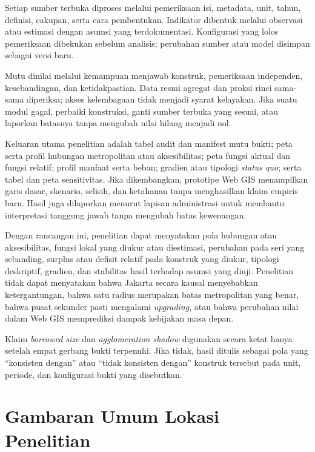 \documentclass[11pt,a4paper,oneside,openany,indonesian]{report}
\begin{document}
Setiap sumber terbuka diproses melalui pemeriksaan isi, metadata, unit,
tahun, definisi, cakupan, serta cara pembentukan. Indikator dibentuk
melalui observasi atau estimasi dengan asumsi yang terdokumentasi.
Konfigurasi yang lolos pemeriksaan dibekukan sebelum analisis; perubahan
sumber atau model disimpan sebagai versi baru.

Mutu dinilai melalui kemampuan menjawab konstruk, pemeriksaan
independen, kesebandingan, dan ketidakpastian. Data resmi agregat dan
proksi rinci sama-sama diperiksa; akses kelembagaan tidak menjadi syarat
kelayakan. Jika suatu modul gagal, perbaiki konstruksi, ganti sumber
terbuka yang sesuai, atau laporkan batasnya tanpa mengubah nilai hilang
menjadi nol.

Keluaran utama penelitian adalah tabel audit dan manifest mutu bukti;
peta serta profil hubungan metropolitan atau aksesibilitas; peta fungsi
aktual dan fungsi relatif; profil manfaat serta beban; gradien atau
tipologi \emph{status quo}; serta tabel dan peta sensitivitas. Jika
dikembangkan, prototipe Web GIS menampilkan garis dasar, skenario,
selisih, dan ketahanan tanpa menghasilkan klaim empiris baru. Hasil juga
dilaporkan menurut lapisan administrasi untuk membantu interpretasi
tanggung jawab tanpa mengubah batas kewenangan.

Dengan rancangan ini, penelitian dapat menyatakan pola hubungan atau
aksesibilitas, fungsi lokal yang diukur atau diestimasi, perubahan pada
seri yang sebanding, surplus atau defisit relatif pada konstruk yang
diukur, tipologi deskriptif, gradien, dan stabilitas hasil terhadap
asumsi yang diuji. Penelitian tidak dapat menyatakan bahwa Jakarta
secara kausal menyebabkan ketergantungan, bahwa satu radius merupakan
batas metropolitan yang benar, bahwa pusat sekunder pasti mengalami
\emph{upgrading}, atau bahwa perubahan nilai dalam Web GIS memprediksi
dampak kebijakan masa depan.

Klaim \emph{borrowed size} dan \emph{agglomeration shadow} digunakan
secara ketat hanya setelah empat gerbang bukti terpenuhi. Jika tidak,
hasil ditulis sebagai pola yang ``konsisten dengan'' atau ``tidak
konsisten dengan'' konstruk tersebut pada unit, periode, dan konfigurasi
bukti yang disebutkan.

\clearpage

\chapter{Gambaran Umum Lokasi Penelitian}
\end{document}
